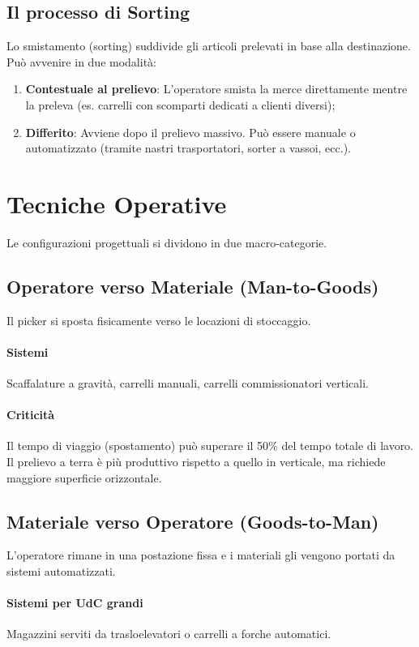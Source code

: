 \subsection{Il processo di Sorting}
Lo smistamento (sorting) suddivide gli articoli prelevati in base alla destinazione. Può avvenire in due modalità:
\begin{enumerate}
    \item \textbf{Contestuale al prelievo}: L'operatore smista la merce direttamente mentre la preleva (es. carrelli con scomparti dedicati a clienti diversi);
    \item \textbf{Differito}: Avviene dopo il prelievo massivo. Può essere manuale o automatizzato (tramite nastri trasportatori, sorter a vassoi, ecc.).
\end{enumerate}

%
\section{Tecniche Operative}
Le configurazioni progettuali si dividono in due macro-categorie.
%
\subsection{Operatore verso Materiale (Man-to-Goods)}
Il picker si sposta fisicamente verso le locazioni di stoccaggio.
%
\paragraph{Sistemi} Scaffalature a gravità, carrelli manuali, carrelli commissionatori verticali.
%
\paragraph{Criticità} Il tempo di viaggio (spostamento) può superare il 50\% del tempo totale di lavoro. Il prelievo a terra è più produttivo rispetto a quello in verticale, ma richiede maggiore superficie orizzontale.

%
\subsection{Materiale verso Operatore (Goods-to-Man)}
L'operatore rimane in una postazione fissa e i materiali gli vengono portati da sistemi automatizzati.
%
\paragraph{Sistemi per UdC grandi} Magazzini serviti da trasloelevatori o carrelli a forche automatici.
%
